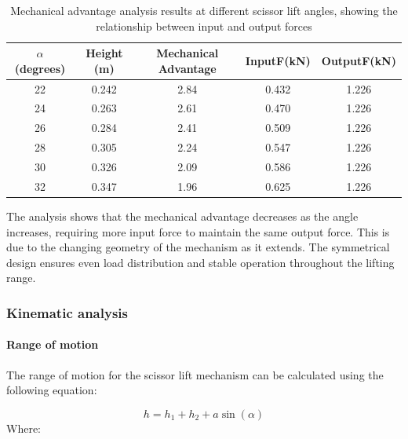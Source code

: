 \documentclass[../../main]{subfiles}
\begin{document}
\begin{table}[h!]
  \centering
  \begin{tcolorbox}[
    colback=red!5!white,colframe=red!75!black,
    title={\textbf{Mechanical advantage analysis}},
    fonttitle=\bfseries, coltitle=white, width=0.98\linewidth]
  \begin{tabular}{|c|c|c|c|c|}
      \hline \rowcolor{red!20}
      $\alpha$ (degrees) & Height (m) & Mechanical Advantage &InputF(kN) & OutputF(kN) \\ \hline
      22 & 0.242 & 2.84 & 0.432 & 1.226 \\ \hline
      24 & 0.263 & 2.61 & 0.470 & 1.226 \\ \hline
      26 & 0.284 & 2.41 & 0.509 & 1.226 \\ \hline
      28 & 0.305 & 2.24 & 0.547 & 1.226 \\ \hline
      30 & 0.326 & 2.09 & 0.586 & 1.226 \\ \hline
      32 & 0.347 & 1.96 & 0.625 & 1.226 \\ \hline
  \end{tabular}
\end{tcolorbox}
  \caption[Mechanical Advantage Analysis]{Mechanical advantage analysis results at different scissor lift angles, showing the relationship between input and output forces}
  \label{tab:mechanical_advantage}
\end{table}


The analysis shows that the mechanical advantage decreases as the angle
increases, requiring more input force to maintain the same output force.
This is due to the changing geometry of the mechanism as it extends. The
symmetrical design ensures even load distribution and stable operation
throughout the lifting range.
\newpage
\subsubsection{Kinematic analysis}\label{kinematic-analysis}

\paragraph{Range of motion}

The range of motion for the scissor lift mechanism can be calculated
using the following equation:

\begin{equation}
  h = h_1 + h_2 + a \sin(\alpha)
\end{equation}
Where:
\end{document}
